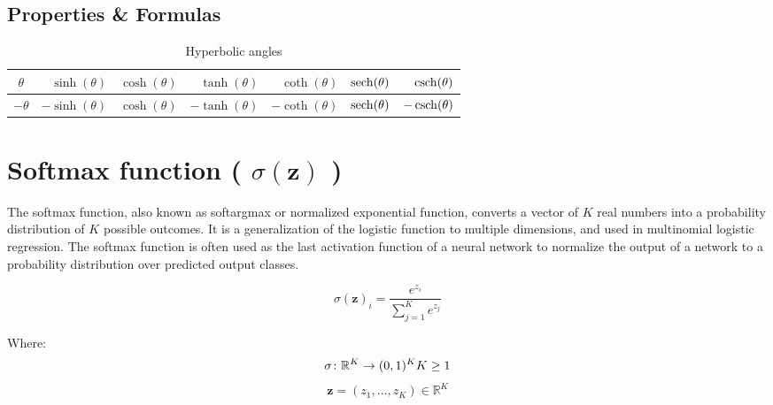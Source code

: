 \subsection{Properties \& Formulas}

\begin{alternateColorTable}
\begin{table}[H]
    \centering
    \begin{tabular}{|c|r|r|r|r|r|r|}
        \hline
        $\theta$ & $\sinh(\theta)$ & $\cosh(\theta)$ & $\tanh(\theta)$ & $\coth(\theta)$ & $\operatorname{sech}(\theta)$ & $\operatorname{csch}(\theta)$ \\ \hline

        $-\theta$ & $-\sinh(\theta)$ & $\cosh(\theta)$ & $-\tanh(\theta)$ & $-\coth(\theta)$ & $\operatorname{sech}(\theta)$ & $-\operatorname{csch}(\theta)$ \\ \hline
    \end{tabular}
    \caption{Hyperbolic angles}
\end{table}
\end{alternateColorTable}


\section{Softmax function ( $\sigma (\mathbf {z})$ ) \cite{wiki-softmax-function}}\label{Softmax function}
The softmax function, also known as softargmax or normalized exponential function, converts a vector of $K$ real numbers into a probability distribution of $K$ possible outcomes. It is a generalization of the logistic function to multiple dimensions, and used in multinomial logistic regression. The softmax function is often used as the last activation function of a neural network to normalize the output of a network to a probability distribution over predicted output classes.

\[
    {\displaystyle \sigma (\mathbf {z} )_{i}={\displaystyle\frac {e^{z_{i}}}{\sum _{j=1}^{K}e^{z_{j}}}}}
\]

Where:
\[
    {\displaystyle \sigma \colon \mathbb {R} ^{K}\to (0,1)^{K}}
    \hfill
    {\displaystyle K\geq 1}
\]
\[
    {\displaystyle \mathbf {z} =(z_{1},\dotsc ,z_{K})\in \mathbb {R} ^{K}}
\]





















































